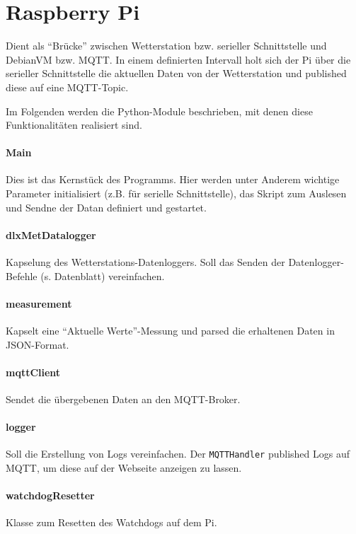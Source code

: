 \section{Raspberry Pi}
Dient als ``Brücke'' zwischen Wetterstation bzw. serieller Schnittstelle und DebianVM bzw. MQTT. In einem definierten Intervall holt sich der Pi über die serieller Schnittstelle die aktuellen Daten von der Wetterstation und published diese auf eine MQTT-Topic. 

Im Folgenden werden die Python-Module beschrieben, mit denen diese Funktionalitäten realisiert sind.

\paragraph{Main}
Dies ist das Kernstück des Programms. Hier werden unter Anderem wichtige Parameter initialisiert (z.B. für serielle Schnittstelle), das Skript zum Auslesen und Sendne der Datan definiert und gestartet.
\paragraph{dlxMetDatalogger}
Kapselung des Wetterstations-Datenloggers. Soll das Senden der Datenlogger-Befehle (s. Datenblatt) vereinfachen.
\paragraph{measurement}
Kapselt eine ``Aktuelle Werte''-Messung und parsed die erhaltenen Daten in JSON-Format.
\paragraph{mqttClient}
Sendet die übergebenen Daten an den MQTT-Broker.
\paragraph{logger}
Soll die Erstellung von Logs vereinfachen. Der \texttt{MQTTHandler} published Logs auf MQTT, um diese auf der Webseite anzeigen zu lassen.
\paragraph{watchdogResetter}
Klasse zum Resetten des Watchdogs auf dem Pi.